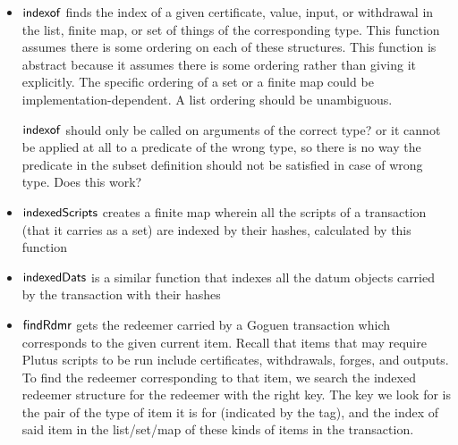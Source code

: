 \begin{itemize}
  \item $\mathsf{indexof}$ finds the index of a given certificate, value, input, or
  withdrawal in the list, finite map, or set of things of the corresponding type.
  This function assumes there is some ordering on each of these structures.
  This function is abstract because it assumes there is some ordering rather
  than giving it explicitly. The specific ordering of a set or a finite map
  could be implementation-dependent. A list ordering should be unambiguous.
  \begin{note}
    $\mathsf{indexof}$ should only be called on arguments of the correct type? or
    it cannot be applied at all to a predicate of the wrong type, so
    there is no way the predicate in the subset definition should not be satisfied
    in case of wrong type. Does this work?
  \end{note}
  \item $\mathsf{indexedScripts}$ creates a finite map wherein all the scripts
  of a transaction (that it carries as a set) are indexed by their hashes,
  calculated by this function
  \item $\mathsf{indexedDats}$ is a similar function that indexes all the datum objects
  carried by the transaction with their hashes
  \item $\mathsf{findRdmr}$ gets the redeemer carried by a Goguen transaction
   which corresponds to the given current item. Recall that items that may require
   Plutus scripts to be run include certificates, withdrawals, forges,
   and outputs. To find the redeemer corresponding to that item, we search
   the indexed redeemer structure for the redeemer with the right key.
   The key we look for is the
   pair of the type of item it is for (indicated by the tag), and the index of
   said item in the list/set/map of these kinds of items in the transaction.
\end{itemize}



